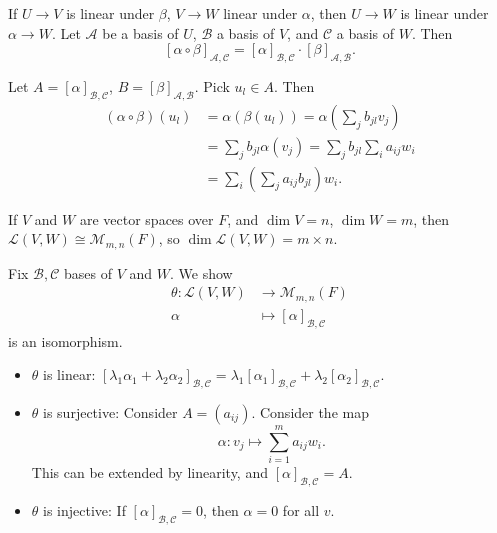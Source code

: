 \documentclass[12pt]{article}
\begin{document}
\begin{lemma}
	If $U \to V$ is linear under $\beta$, $V \to W$ linear under $\alpha$, then $U \to W$ is linear under $\alpha \to W$. Let $\mathcal{A}$ be a basis of $U$, $\mathcal{B}$ a basis of $V$, and $\mathcal{C}$ a basis of $W$. Then
	\[
		[\alpha \circ \beta]_{\mathcal{A}, \mathcal{C}} = [\alpha]_{\mathcal{B}, \mathcal{C}} \cdot [\beta]_{\mathcal{A}, \mathcal{B}}
	.\] 
\end{lemma}

\begin{proofbox}
	Let $A = [\alpha]_{\mathcal{B}, \mathcal{C}}$, $B = [\beta]_{\mathcal{A}, \mathcal{B}}$. Pick $u_l \in A$. Then
	\begin{align*}
		(\alpha \circ \beta)(u_l) &= \alpha(\beta(u_l)) = \alpha\left( \sum_{j} b_{jl} v_j \right) \\
					  &= \sum_{j} b_{jl} \alpha(v_j) = \sum_{j}b_{jl}\sum_{i}a_{ij}w_i \\
					  &= \sum_{i}\left( \sum_{j} a_{ij} b_{jl} \right) w_i.
	\end{align*}
\end{proofbox}

\begin{proposition}
If $V$ and $W$ are vector spaces over $F$, and $\dim V = n$, $\dim W = m$, then $\mathcal{L}(V, W) \cong \mathcal{M}_{m, n}(F)$, so $\dim \mathcal{L}(V, W) = m \times n$.
\end{proposition}

\begin{proofbox}
	Fix $\mathcal{B}, \mathcal{C}$ bases of $V$ and $W$. We show
\begin{align*}
	\theta : \mathcal{L}(V, W) &\to \mathcal{M}_{m, n}(F) \\
	\alpha &\mapsto [\alpha]_{\mathcal{B}, \mathcal{C}}
\end{align*}
is an isomorphism.
\begin{itemize}
	\item $\theta$ is linear:
		$[\lambda_1 \alpha_1 + \lambda_2 \alpha_2]_{\mathcal{B}, \mathcal{C}} = \lambda_1 [\alpha_1]_{\mathcal{B}, \mathcal{C}} + \lambda_2[\alpha_2]_{\mathcal{B}, \mathcal{C}}$.
	\item $\theta$ is surjective: Consider $A = (a_{ij})$. Consider the map
		\[
		\alpha : v_j \mapsto \sum_{i = 1}^{m} a_{ij}w_i
		.\]
		This can be extended by linearity, and $[\alpha]_{\mathcal{B}, \mathcal{C}} = A$.
	\item $\theta$ is injective: If $[\alpha]_{\mathcal{B}, \mathcal{C}} = 0$, then $\alpha = 0$ for all $v$.
\end{itemize}
\end{proofbox}
\end{document}
